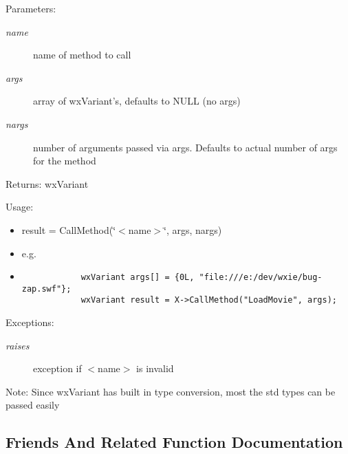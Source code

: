 \begin{Desc}
\item[Parameters:]
\begin{description}
\item[{\em name}]name of method to call \item[{\em args}]array of wx\-Variant's, defaults to NULL (no args) \item[{\em nargs}]number of arguments passed via args. Defaults to actual number of args for the method \end{description}
\end{Desc}
\begin{Desc}
\item[Returns:]wx\-Variant \end{Desc}


\begin{Desc}
\item[Usage:]\begin{itemize}
\item result = Call\-Method(\char`\"{}$<$name$>$\char`\"{}, args, nargs)\item e.g.\item 

\footnotesize\begin{verbatim}
            wxVariant args[] = {0L, "file:///e:/dev/wxie/bug-zap.swf"};
            wxVariant result = X->CallMethod("LoadMovie", args);
\end{verbatim}\normalsize
\end{itemize}
\end{Desc}
\begin{Desc}
\item[Exceptions:]
\begin{description}
\item[{\em raises}]exception if $<$name$>$ is invalid \end{description}
\end{Desc}
\begin{Desc}
\item[Note:]Since wx\-Variant has built in type conversion, most the std types can be passed easily \end{Desc}


\subsection{Friends And Related Function Documentation}
